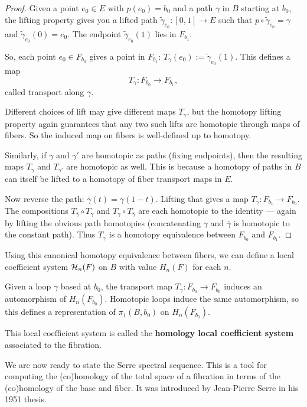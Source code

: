 \documentclass[12pt]{article}
\begin{document}
\begin{proof}
    Given a point $e_0\in E$ with $p(e_0)=b_0$ and a path $\gamma$ in $B$ starting at $b_0$, the lifting property gives you a lifted path $\widetilde\gamma_{e_0} : [0,1]\to E$ such that $p\circ \widetilde\gamma_{e_0} = \gamma$ and $\widetilde\gamma_{e_0}(0)=e_0$. The endpoint $\widetilde\gamma_{e_0}(1)$ lies in $F_{b_1}$.

    So, each point $e_0\in F_{b_0}$ gives a point in $F_{b_1}$: $T_\gamma(e_0) := \widetilde\gamma_{e_0}(1)$. This defines a map
    \[T_\gamma : F_{b_0} \longrightarrow F_{b_1},\]
    called transport along $\gamma$.

    Different choices of lift may give different maps $T_\gamma$, but the homotopy lifting property again guarantees that any two such lifts are homotopic through maps of fibers. So the induced map on fibers is well-defined up to homotopy.

    Similarly, if $\gamma$ and $\gamma'$ are homotopic as paths (fixing endpoints), then the resulting maps $T_\gamma$ and $T_{\gamma'}$ are homotopic as well. This is because a homotopy of paths in $B$ can itself be lifted to a homotopy of fiber transport maps in $E$.

    Now reverse the path: $\bar\gamma(t) = \gamma(1-t)$. Lifting that gives a map $T_{\bar\gamma}:F_{b_1}\to F_{b_0}$. The compositions $T_{\bar\gamma}\circ T_\gamma$ and $T_\gamma\circ T_{\bar\gamma}$ are each homotopic to the identity — again by lifting the obvious path homotopies (concatenating $\gamma$ and $\bar\gamma$ is homotopic to the constant path). Thus $T_\gamma$ is a homotopy equivalence between $F_{b_0}$ and $F_{b_1}$.
\end{proof}
Using this canonical homotopy equivalence between fibers, we can define a local coefficient system ${\mathcal{H}}_n(F)$ on $B$ with value $H_n(F)$ for each $n$.
\begin{definition}
     Given a loop $\gamma$ based at $b_0$, the transport map $T_\gamma : F_{b_0} \to F_{b_0}$ induces an automorphism of $H_n(F_{b_0})$. Homotopic loops induce the same automorphism, so this defines a representation of $\pi_1(B,b_0)$ on $H_n(F_{b_0})$. 

This local coefficient system is called the \textbf{homology local coefficient system} associated to the fibration. 
\end{definition}

We are now ready to state the Serre spectral sequence. This is a tool for computing the (co)homology of the total space of a fibration in terms of the (co)homology of the base and fiber. It was introduced by Jean-Pierre Serre in his 1951 thesis.
\end{document}
